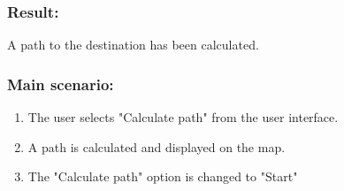 \begin{framed}
	\subsubsection*{Result:}
	A path to the destination has been calculated.
	
	\subsubsection*{Main scenario:}
	\begin{enumerate}
		\item The user selects "Calculate path" from the user interface.
		\item A path is calculated and displayed on the map. 
		\item The "Calculate path" option is changed to "Start"
	\end{enumerate}	
\end{framed}	


